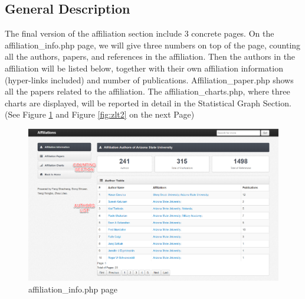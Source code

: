 \documentclass{book}
\begin{document}
\subsection {General Description}

The final version of the affiliation section include 3 concrete pages. On the affiliation\_info.php page, we will give three numbers on top of the page, counting all the authors, papers, and references in the affiliation. Then the authors in the affiliation will be listed below, together with their own affiliation information (hyper-links included) and number of publications. Affiliation\_paper.php shows all the papers related to the affiliation. The affiliation\_charts.php, where three charts are displayed, will be reported in detail in the Statistical Graph Section.
(See Figure \ref{fig:zlt1} and Figure \ref{fig:zlt2} on the next Page)



\begin{figure}[h]
\centering
\includegraphics[scale=0.35]{img/zlt_aff_demo1.png}
\caption{affiliation\_info.php page}
\label{fig:zlt1}
\end{figure}
\end{document}
